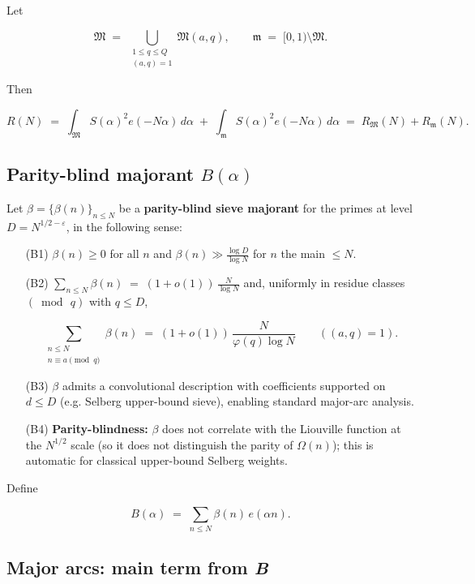 \documentclass[11pt]{article}
\theoremstyle{definition}
\theoremstyle{remark}
\numberwithin{equation}{part}
\begin{document}
Let

$$
	\mathfrak M\;=\;\bigcup_{\substack{1\le q\le Q\\ (a,q)=1}}\mathfrak M(a,q),
	\qquad
	\mathfrak m\;=\;[0,1)\setminus\mathfrak M .
$$

Then

$$
	R(N)\;=\;\int_{\mathfrak M} S(\alpha)^2 e(-N\alpha)\,d\alpha\;+\;
	\int_{\mathfrak m} S(\alpha)^2 e(-N\alpha)\,d\alpha
	\;=\;R_{\mathfrak M}(N)+R_{\mathfrak m}(N).
$$


\subsection{Parity-blind majorant \texorpdfstring{$B(\alpha)$}{B\textalpha}}

Let $\beta=\{\beta(n)\}_{n\le N}$ be a \textbf{parity-blind sieve majorant} for the primes at level $D=N^{1/2-\varepsilon}$, in the following sense:

\begin{itemize}[leftmargin=*]
	\item[(B1)] $\beta(n)\ge 0$ for all $n$ and $\beta(n)\gg \tfrac{\log D}{\log N}$ for $n$ the main $\le N$.
	\item[(B2)] $\displaystyle \sum_{n\le N}\beta(n)\;=\;(1+o(1))\,\frac{N}{\log N}$ and, uniformly in residue classes $(\bmod\,q)$ with $q\le D$,

	      $$
		      \sum_{\substack{n\le N\\ n\equiv a\!\!\!\pmod q}}\beta(n)
		      \;=\;(1+o(1))\,\frac{N}{\varphi(q)\log N}\qquad ((a,q)=1).
	      $$

	\item[(B3)] $\beta$ admits a convolutional description with coefficients supported on $d\le D$ (e.g. Selberg upper-bound sieve), enabling standard major-arc analysis.
	\item[(B4)] \textbf{Parity-blindness:} $\beta$ does not correlate with the Liouville function at the $N^{1/2}$ scale (so it does not distinguish the parity of $\Omega(n)$); this is automatic for classical upper-bound Selberg weights.
\end{itemize}

Define

$$
	B(\alpha)\;=\;\sum_{n\le N}\beta(n)\,e(\alpha n).
$$


\subsection{Major arcs: main term from \textit{B}}
\end{document}
